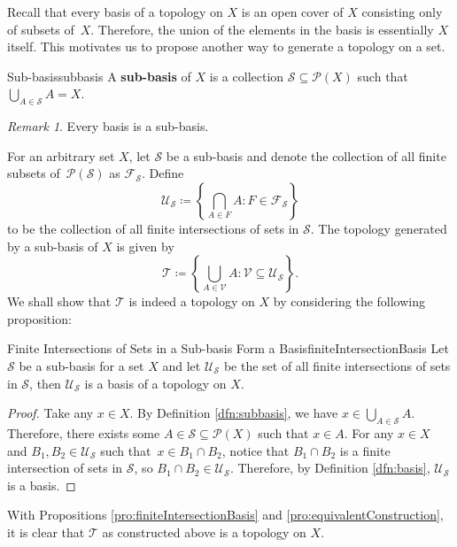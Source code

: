 \documentclass[math]{amznotes}
\theoremstyle{remark}
\newtheorem*{remark}{Remark}
\begin{document}
Recall that every basis of a topology on $X$ is an open cover of $X$ consisting only of subsets of~$X$. Therefore, the union of the elements in the basis is essentially $X$ itself. This motivates us to propose another way to generate a topology on a set.
\begin{dfnbox}{Sub-basis}{subbasis}
    A {\color{red} \textbf{sub-basis}} of $X$ is a collection $\mathcal{S} \subseteq \mathcal{P}\left(X\right)$ such that $\bigcup_{A \in \mathcal{S}}A = X$.
\end{dfnbox}
\begin{notebox}
    \begin{remark}
        Every basis is a sub-basis.
    \end{remark}
\end{notebox}
For an arbitrary set $X$, let $\mathcal{S}$ be a sub-basis and denote the collection of all finite subsets of~$\mathcal{P}\left(\mathcal{S}\right)$ as $\mathcal{F}_{\mathcal{S}}$. Define 
\begin{equation*}
    \mathcal{U}_{\mathcal{S}} \coloneqq \left\{\bigcap_{A \in F}A \colon F \in \mathcal{F}_{\mathcal{S}}\right\}
\end{equation*}
to be the collection of all finite intersections of sets in $\mathcal{S}$. The topology generated by a sub-basis of $X$ is given by 
\begin{equation*}
    \mathcal{T} \coloneqq \left\{\bigcup_{A \in \mathcal{V}}A  \colon \mathcal{V}\subseteq \mathcal{U}_{\mathcal{S}}\right\}.
\end{equation*}
We shall show that $\mathcal{T}$ is indeed a topology on $X$ by considering the following proposition:
\begin{probox}{Finite Intersections of Sets in a Sub-basis Form a Basis}{finiteIntersectionBasis}
    Let $\mathcal{S}$ be a sub-basis for a set $X$ and let $\mathcal{U}_{\mathcal{S}}$ be the set of all finite intersections of sets in $\mathcal{S}$, then $\mathcal{U}_{\mathcal{S}}$ is a basis of a topology on $X$.
    \tcblower
    \begin{proof}
        Take any $x \in X$. By Definition \ref{dfn:subbasis}, we have $x \in \bigcup_{A \in \mathcal{S}}A$. Therefore, there exists some $A \in \mathcal{S} \subseteq \mathcal{P}\left(X\right)$ such that $x \in A$. For any $x \in X$ and $B_1, B_2 \in \mathcal{U}_{\mathcal{S}}$ such that~$x \in B_1 \cap B_2$, notice that $B_1 \cap B_2$ is a finite intersection of sets in $\mathcal{S}$, so $B_1 \cap B_2 \in \mathcal{U}_{\mathcal{S}}$. Therefore, by Definition \ref{dfn:basis}, $\mathcal{U}_{\mathcal{S}}$ is a basis. 
    \end{proof}
\end{probox}
With Propositions \ref{pro:finiteIntersectionBasis} and \ref{pro:equivalentConstruction}, it is clear that $\mathcal{T}$ as constructed above is a topology on $X$.
\end{document}
